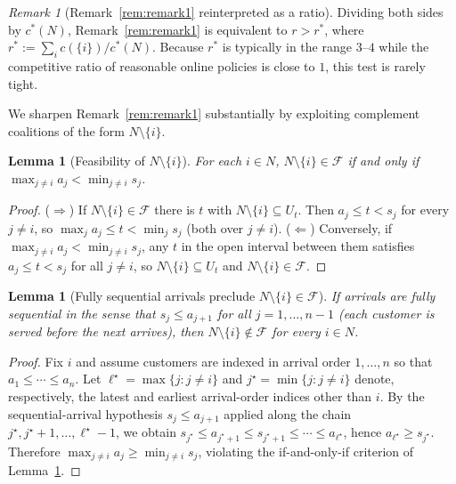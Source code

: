 \documentclass[11pt]{article}
\theoremstyle{plain}
\newtheorem{lemma}[theorem]{Lemma}
\theoremstyle{definition}
\theoremstyle{remark}
\newtheorem{remark}[theorem]{Remark}
\newcommand{\F}{\mathcal{F}}
\newcommand{\cstar}{c^{\ast}}
\begin{document}
\begin{remark}[Remark~\ref{rem:remark1} reinterpreted as a ratio]
\label{rem:rstar}
Dividing both sides by $\cstar(N)$, Remark~\ref{rem:remark1} is equivalent to $r > r^{\ast}$, where $r^{\ast} := \sum_i c(\{i\})/\cstar(N)$. Because $r^{\ast}$ is typically in the range $3$--$4$ while the competitive ratio of reasonable online policies is close to $1$, this test is rarely tight.
\end{remark}

We sharpen Remark~\ref{rem:remark1} substantially by exploiting complement coalitions of the form $N\setminus\{i\}$.

\begin{lemma}[Feasibility of $N\setminus\{i\}$]
\label{lem:lemma51}
For each $i\in N$, $N\setminus\{i\}\in\F$ if and only if $\max_{j\neq i} a_j < \min_{j\neq i} s_j$.
\end{lemma}

\begin{proof}
($\Rightarrow$) If $N\setminus\{i\}\in\F$ there is $t$ with $N\setminus\{i\}\subseteq U_t$. Then $a_j\le t < s_j$ for every $j\neq i$, so $\max_j a_j \le t < \min_j s_j$ (both over $j\neq i$). ($\Leftarrow$) Conversely, if $\max_{j\neq i} a_j < \min_{j\neq i} s_j$, any $t$ in the open interval between them satisfies $a_j\le t<s_j$ for all $j\neq i$, so $N\setminus\{i\}\subseteq U_t$ and $N\setminus\{i\}\in\F$.
\end{proof}

\begin{lemma}[Fully sequential arrivals preclude $N\setminus\{i\}\in\F$]
\label{lem:lemma52}
If arrivals are fully sequential in the sense that $s_j \le a_{j+1}$ for all $j=1,\ldots,n-1$ (each customer is served before the next arrives), then $N\setminus\{i\}\notin\F$ for every $i\in N$.
\end{lemma}

\begin{proof}
Fix $i$ and assume customers are indexed in arrival order $1,\ldots,n$ so that $a_1 \le \cdots \le a_n$. Let $\ell^{\star}=\max\{j:j\neq i\}$ and $j^{\star}=\min\{j:j\neq i\}$ denote, respectively, the latest and earliest arrival-order indices other than $i$. By the sequential-arrival hypothesis $s_j \le a_{j+1}$ applied along the chain $j^{\star}, j^{\star}+1, \ldots, \ell^{\star}-1$, we obtain $s_{j^{\star}} \le a_{j^{\star}+1} \le s_{j^{\star}+1} \le \cdots \le a_{\ell^{\star}}$, hence $a_{\ell^{\star}} \ge s_{j^{\star}}$. Therefore $\max_{j\neq i} a_j \ge \min_{j\neq i} s_j$, violating the if-and-only-if criterion of Lemma~\ref{lem:lemma51}.
\end{proof}
\end{document}
